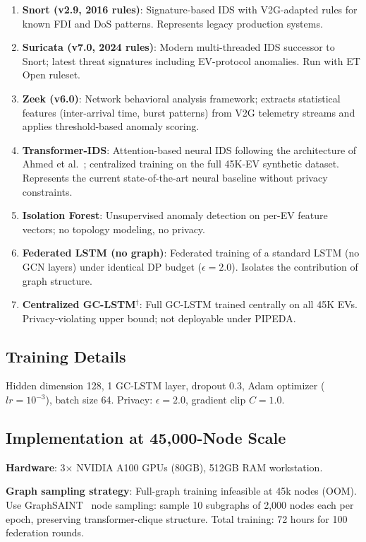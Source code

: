\documentclass[journal]{IEEEtran}
\begin{document}
\begin{enumerate}
    \item \textbf{Snort (v2.9, 2016 rules)}: Signature-based IDS with V2G-adapted rules for known FDI and DoS patterns. Represents legacy production systems.
    \item \textbf{Suricata (v7.0, 2024 rules)}: Modern multi-threaded IDS successor to Snort; latest threat signatures including EV-protocol anomalies. Run with ET Open ruleset.
    \item \textbf{Zeek (v6.0)}: Network behavioral analysis framework; extracts statistical features (inter-arrival time, burst patterns) from V2G telemetry streams and applies threshold-based anomaly scoring.
    \item \textbf{Transformer-IDS}: Attention-based neural IDS following the architecture of Ahmed et al.~\cite{ahmed_transformer}; centralized training on the full 45K-EV synthetic dataset. Represents the current state-of-the-art neural baseline without privacy constraints.
    \item \textbf{Isolation Forest}: Unsupervised anomaly detection on per-EV feature vectors; no topology modeling, no privacy.
    \item \textbf{Federated LSTM (no graph)}: Federated training of a standard LSTM (no GCN layers) under identical DP budget ($\epsilon=2.0$). Isolates the contribution of graph structure.
    \item \textbf{Centralized GC-LSTM}$^\dagger$: Full GC-LSTM trained centrally on all 45K EVs. Privacy-violating upper bound; not deployable under PIPEDA.
\end{enumerate}

\subsection{Training Details}

Hidden dimension 128, 1 GC-LSTM layer, dropout 0.3, Adam optimizer ($lr=10^{-3}$), batch size 64. Privacy: $\epsilon=2.0$, gradient clip $C=1.0$.

\subsection{Implementation at 45,000-Node Scale}

\textbf{Hardware}: 3× NVIDIA A100 GPUs (80GB), 512GB RAM workstation.

\textbf{Graph sampling strategy}: Full-graph training infeasible at 45k nodes (OOM). Use GraphSAINT~\cite{graphsaint} node sampling: sample 10 subgraphs of 2,000 nodes each per epoch, preserving transformer-clique structure. Total training: 72 hours for 100 federation rounds.
\end{document}
